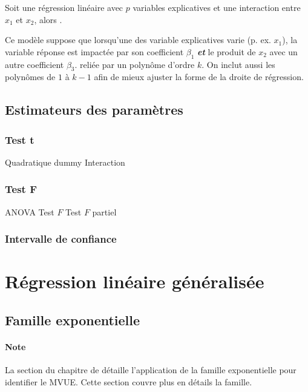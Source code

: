 \documentclass[french]{article}
\begin{document}
\begin{multicols*}{2}
\begin{definitionNOHFILLsub}
Soit une régression linéaire avec $p$ variables explicatives et une interaction entre $x_{1}$ et $x_{2}$, alors . 

\bigskip

Ce modèle suppose que lorsqu'une des variable explicatives varie (p. ex. $x_{1}$), la variable réponse est impactée par son coefficient $\beta_{1}$ \textbf{\textit{et}} le produit de $x_{2}$ avec un autre coefficient $\beta_{3}$. reliée par un polynôme d'ordre $k$. On inclut aussi les polynômes de $1$ à $k - 1$ afin de mieux ajuster la forme de la droite de régression.
\end{definitionNOHFILLsub}



\columnbreak
\subsection{Estimateurs des paramètres}
\subsubsection{Test t}
Quadratique
dummy
Interaction



\subsubsection{Test F}
ANOVA
Test $F$
Test $F$ partiel


\subsubsection{Intervalle de confiance}


\newpage
\section{Régression linéaire généralisée}\label{sec:GLM}


\subsection{Famille exponentielle}\label{subsec:ExpFamRegr}
\paragraph{Note}	La section \underline{\textit{}} du chapitre de \underline{\textit{}} détaille l'application de la famille exponentielle pour identifier le MVUE. Cette section couvre plus en détails la famille.


\end{multicols*}
\end{document}
